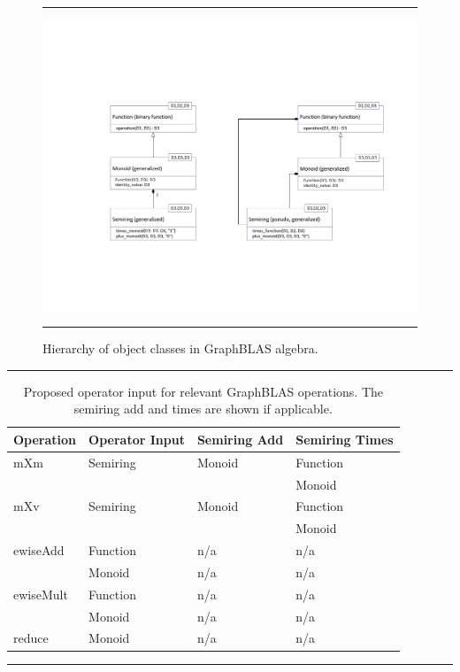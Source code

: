 \begin{figure}[htb]
	\hrule
	\begin{center}
		\includegraphics[width=1.0\linewidth,trim=0in 2in 0in 2in]{Algebra_Hierarchy_proposed.pdf}
	\end{center}
	\caption{Hierarchy of object classes in GraphBLAS algebra.}
	\label{Fig:AlgebraHierarchyProposed}
	\hrule
\end{figure}

\begin{table}
	\hrule
	\begin{center}
		\caption{Proposed operator input for relevant GraphBLAS operations. The semiring add and times are shown if applicable.}
		\label{Tab:OperatorInputType}
		\begin{tabular}{l|l|l|l}
			Operation	& Operator Input & Semiring Add & Semiring Times  \\ \hline
			mXm & Semiring & Monoid & Function \\
			&  &  & Monoid \\
			mXv & Semiring & Monoid & Function  \\
			&  &  & Monoid  \\
			ewiseAdd &  Function & n/a & n/a  \\
			& Monoid & n/a & n/a  \\
			ewiseMult & Function & n/a & n/a  \\
			& Monoid & n/a & n/a  \\
			reduce & Monoid & n/a & n/a \\
		\end{tabular}
	\end{center}
	\hrule
\end{table}

